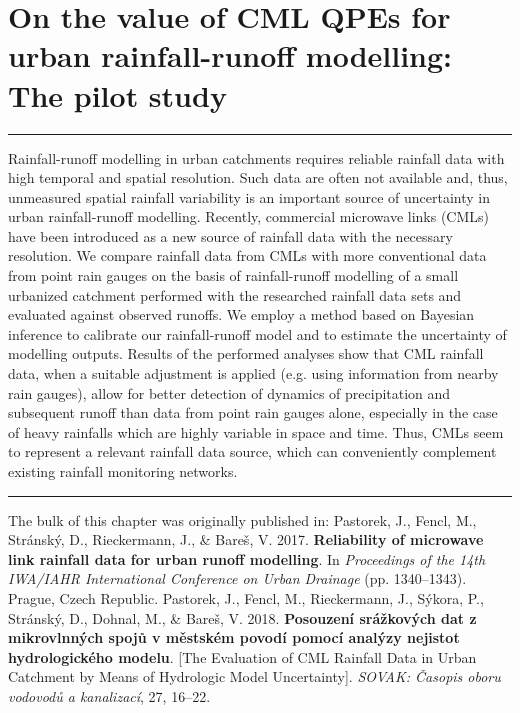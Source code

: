 \documentclass{ctuthesis}\usepackage[]{graphicx}\usepackage[]{color}
\begin{document}
        


\chapter{On the value of CML QPEs for urban rainfall-runoff modelling: The pilot study} \label{chap4}

\rule{\textwidth}{0.4pt}
Rainfall-runoff modelling in urban catchments requires reliable rainfall data with high temporal and spatial resolution. Such data are often not available and, thus, unmeasured spatial rainfall variability is an important source of uncertainty in urban rainfall-runoff modelling. Recently, commercial microwave links (CMLs) have been introduced as a new source of rainfall data with the necessary resolution. We compare rainfall data from CMLs with more conventional data from point rain gauges on the basis of rainfall-runoff modelling of a small urbanized catchment performed with the researched rainfall data sets and evaluated against observed runoffs. We employ a method based on Bayesian inference to calibrate our rainfall-runoff model and to estimate the uncertainty of modelling outputs. Results of the performed analyses show that CML rainfall data, when a suitable adjustment is applied (e.g. using information from nearby rain gauges), allow for better detection of dynamics of precipitation and subsequent runoff than data from point rain gauges alone, especially in the case of heavy rainfalls which are highly variable in space and time. Thus, CMLs seem to represent a relevant rainfall data source, which can conveniently complement existing rainfall monitoring networks.
\rule[0.2cm]{\textwidth}{0.4pt}
{\footnotesize The bulk of this chapter was originally published in: \newline
\-\hspace{0.5cm}
Pastorek, J., Fencl, M., Stránský, D., Rieckermann, J., \& Bareš, V. 2017. \textbf{Reliability
of microwave link rainfall data for urban runoff modelling}. In \emph{Proceedings of the
14th IWA/IAHR International Conference on Urban Drainage} (pp. 1340--1343). Prague, Czech Republic.
\newline \-\hspace{0.5cm}
Pastorek, J., Fencl, M., Rieckermann, J., Sýkora, P., Stránský, D., Dohnal, M., \& Bareš, V. 2018. \textbf{Posouzení srážkových dat z mikrovlnných spojů v městském povodí pomocí analýzy nejistot hydrologického modelu}. [The Evaluation of CML Rainfall Data in Urban Catchment by Means of Hydrologic Model Uncertainty]. \emph{SOVAK: Časopis oboru vodovodů a kanalizací}, 27, 16--22.
}
\end{document}
